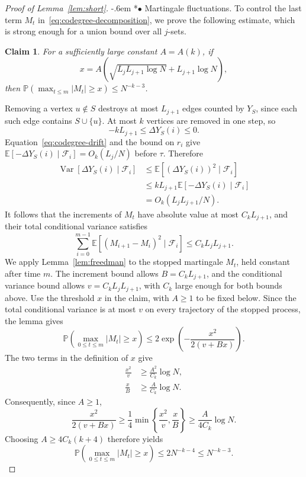\documentclass[11pt,reqno]{amsart}
\makeatletter
\numberwithin{equation}{section}
\renewcommand{\paragraph}{\@startsection{paragraph}{4}%
    \z@{.75\linespacing\@plus.2\linespacing\@minus.1\linespacing}%
    {-.6em}%
    {\normalfont\bfseries}}
\newcommand{\proofparagraph}[1]{%
    \paragraph*{$\bullet$ #1}\ignorespaces}
\theoremstyle{plain}
\newtheorem{claim}{Claim}[section]
\newenvironment{claimproof}[1][Proof]{\par
    \pushQED{\qed}%
    \renewcommand{\qedsymbol}{$\blacksquare$}
    \normalfont \topsep6\p@\@plus6\p@\relax
    \trivlist
    \item[\hskip\labelsep
    \textit{#1}\@addpunct{.}~]\ignorespaces
}{%
    \popQED\endtrivlist\@endpefalse
}
\theoremstyle{definition}
\newcommand{\E}{\mathbb E}
\newcommand{\Prob}{\mathbb P}
\newcommand{\Var}{\operatorname{Var}}
\makeatother
\begin{document}
\begin{proof}[Proof of Lemma~\ref{lem:short}]
    \proofparagraph{Martingale fluctuations.}
    To control the last term $M_t$ in~\eqref{eq:codegree-decomposition}, we prove the following estimate, which is strong enough for a union bound over all $j$-sets.
    \begin{claim}\label{clm:short-fluctuations}
        For a sufficiently large constant $A=A(k)$, if
        \[
            x=A\left(\sqrt{L_jL_{j+1}\log N}+L_{j+1}\log N\right),
        \]
        then $\Prob(\max_{t\le m}|M_t|\ge x)\le N^{-k-3}$.
    \end{claim}
    \begin{claimproof}[Proof of Claim~\ref{clm:short-fluctuations}]
    Removing a vertex $u\notin S$ destroys at most $L_{j+1}$ edges counted by $Y_S$, since each such edge contains $S\cup\{u\}$.
    At most $k$ vertices are removed in one step, so
    \[
        -kL_{j+1}\le\Delta Y_S(i)\le0.
    \]
    Equation~\eqref{eq:codegree-drift} and the bound on $r_i$ give $\E[-\Delta Y_S(i)\mid\mathcal F_i]=O_k(L_j/N)$ before $\tau$.
    Therefore
    \[
        \begin{aligned}
            \Var[\Delta Y_S(i)\mid\mathcal F_i]
            &\le\E[(\Delta Y_S(i))^2\mid\mathcal F_i]\\
            &\le kL_{j+1}\E[-\Delta Y_S(i)\mid\mathcal F_i]\\
            &=O_k(L_jL_{j+1}/N).
        \end{aligned}
    \]
    It follows that the increments of $M_t$ have absolute value at most $C_kL_{j+1}$, and their total conditional variance satisfies
    \[
        \sum_{i=0}^{m-1}\E[(M_{i+1}-M_i)^2\mid\mathcal F_i]
        \le C_kL_jL_{j+1}.
    \]
    We apply Lemma~\ref{lem:freedman} to the stopped martingale $M_t$, held constant after time $m$.
    The increment bound allows $B=C_kL_{j+1}$, and the conditional variance bound allows $v=C_kL_jL_{j+1}$, with $C_k$ large enough for both bounds above.
    Use the threshold $x$ in the claim, with $A\ge1$ to be fixed below.
    Since the total conditional variance is at most $v$ on every trajectory of the stopped process, the lemma gives
    \[
        \Prob\left(\max_{0\le t\le m}|M_t|\ge x\right)
        \le2\exp\left(-\frac{x^2}{2(v+Bx)}\right).
    \]
    The two terms in the definition of $x$ give
    \[
        \begin{aligned}
            \frac{x^2}{v}&\ge\frac{A^2}{C_k}\log N,\\
            \frac{x}{B}&\ge\frac{A}{C_k}\log N.
        \end{aligned}
    \]
    Consequently, since $A\ge1$,
    \[
        \frac{x^2}{2(v+Bx)}
        \ge\frac14\min\left\{\frac{x^2}{v},\frac{x}{B}\right\}
        \ge\frac{A}{4C_k}\log N.
    \]
    Choosing $A\ge4C_k(k+4)$ therefore yields
    \[
        \Prob\left(\max_{0\le t\le m}|M_t|\ge x\right)
        \le2N^{-k-4}\le N^{-k-3}.
    \]


\end{claimproof}
\end{proof}
\end{document}
